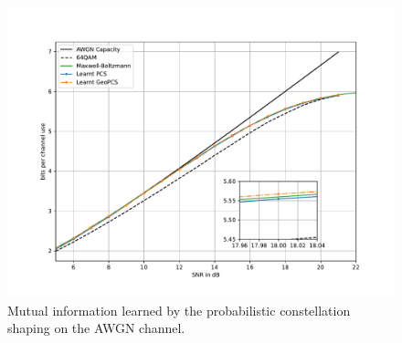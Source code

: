 



\begin{figure}[h]
	\includegraphics[width=\columnwidth]{figs/aref_gcs.pdf}
	\caption{Mutual information learned by the probabilistic constellation shaping on the AWGN channel.}
	\label{fig:arefPerf}
\end{figure}

